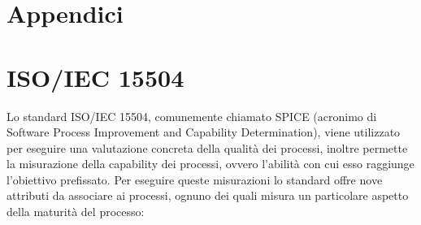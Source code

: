 \section{Appendici}
\appendix
\section{ISO/IEC 15504}
Lo standard ISO/IEC 15504, comunemente chiamato SPICE (acronimo di Software Process Improvement and Capability Determination), viene utilizzato per eseguire una valutazione concreta della qualità dei processi, inoltre permette la misurazione della capability dei processi, ovvero l'abilità con cui esso raggiunge l'obiettivo prefissato. Per eseguire queste misurazioni lo standard offre nove attributi da associare ai processi, ognuno dei quali misura un particolare aspetto della maturità del processo:
